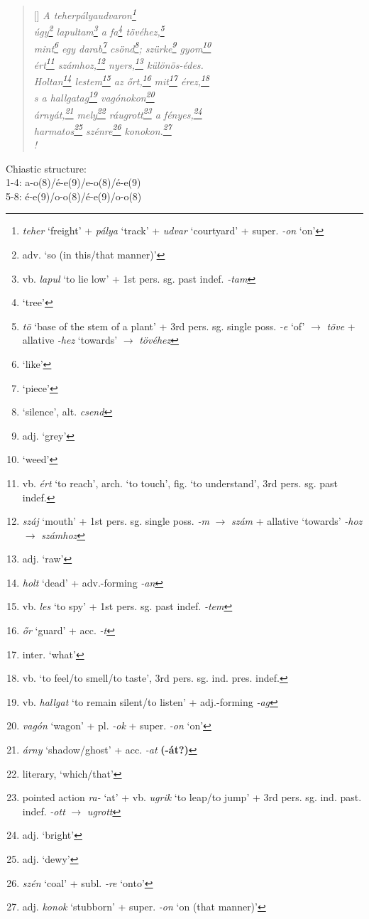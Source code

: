 \documentclass[a4paper,12pt,twoside,final]{book}
\begin{document}
\begin{verse}[\versewidth]
  \it
  A teherpályaudvaron\footnote{\emph{teher} `freight' + \emph{pálya}
  `track' + \emph{udvar} `courtyard' + super. \emph{-on} `on'} \\
  úgy\footnote{adv. `so (in this/that manner)'}
  lapultam\footnote{vb. \emph{lapul} `to lie low'
  + 1st pers. sg. past indef. \emph{-tam}} a
  fa\footnote{`tree'} tövéhez,\footnote{\emph{tö} `base of the stem
  of a plant' + 3rd pers. sg. single poss. \emph{-e} `of'
  $\rightarrow$ \emph{töve} + allative \emph{-hez} `towards'
  $\rightarrow$ \emph{tövéhez}} \\
  mint\footnote{`like'} egy darab\footnote{`piece'}
  csönd\footnote{`silence', alt. \emph{csend}};
  szürke\footnote{adj. `grey'} gyom\footnote{`weed'} \\
  ért\footnote{vb. \emph{ért} `to reach', arch. `to touch',
  fig. `to understand', 3rd pers. sg. past indef.}
  számhoz,\footnote{\emph{száj} `mouth' + 1st
  pers. sg. single poss. \emph{-m} $\rightarrow$ \emph{szám} +
  allative `towards' \emph{-hoz} $\rightarrow$ \emph{számhoz}}
  nyers,\footnote{adj. `raw'} különös-édes. \\
  Holtan\footnote{\emph{holt} `dead' + adv.-forming \emph{-an}}
  lestem\footnote{vb. \emph{les} `to spy' + 1st
  pers. sg. past indef. \emph{-tem}} az őrt,\footnote{\emph{őr} `guard' +
  acc. \emph{-t}} mit\footnote{inter. `what'}
  érez,\footnote{vb. `to feel/to smell/to taste',
  3rd pers. sg. ind. pres. indef.} \\
  s a hallgatag\footnote{vb. \emph{hallgat} `to remain silent/to
  listen' + adj.-forming \emph{-ag}} vagónokon\footnote{\emph{vagón}
  `wagon' + pl. \emph{-ok} + super. \emph{-on} `on'} \\
  árnyát,\footnote{\emph{árny} `shadow/ghost' +
  acc. \emph{-at} \textbf{(-át?)}} mely\footnote{literary,
  `which/that'} ráugrott\footnote{pointed action \emph{ra-} `at' +
  vb. \emph{ugrik} `to leap/to jump' + 3rd
  pers. sg. ind. past. indef. \emph{-ott} $\rightarrow$ \emph{ugrott}} a
  fényes,\footnote{adj. `bright'} \\
  harmatos\footnote{adj. `dewy'} szénre\footnote{\emph{szén}
  `coal' + subl. \emph{-re} `onto'}
  konokon.\footnote{adj. \emph{konok} `stubborn' +
  super. \emph{-on} `on (that manner)'} \\!
\end{verse}

\noindent Chiastic structure: \\
1-4: a-o(8)/é-e(9)/e-o(8)/é-e(9) \\
5-8: é-e(9)/o-o(8)/é-e(9)/o-o(8)
\end{document}

